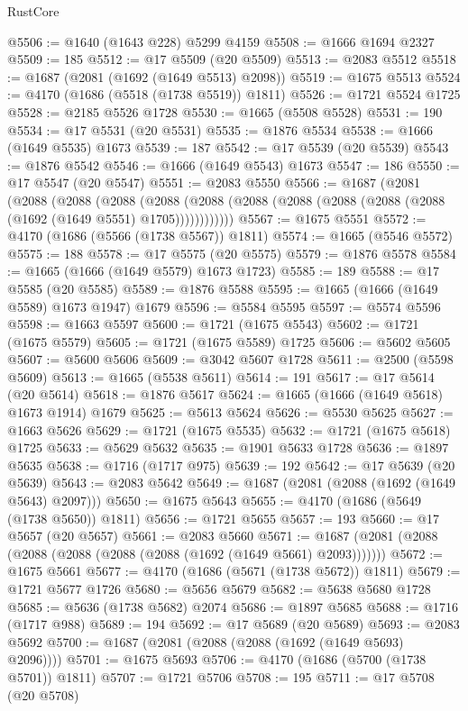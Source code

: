 \begin{lexlean}{RustCore}
\begin{coremodule}
@5506 := @1640 (@1643 @228) @5299 @4159
@5508 := @1666 @1694 @2327
@5509 := 185
@5512 := @17 @5509 (@20 @5509)
@5513 := @2083 @5512
@5518 := @1687 (@2081 (@1692 (@1649 @5513) @2098))
@5519 := @1675 @5513
@5524 := @4170 (@1686 (@5518 (@1738 @5519)) @1811)
@5526 := @1721 @5524 @1725
@5528 := @2185 @5526 @1728
@5530 := @1665 (@5508 @5528)
@5531 := 190
@5534 := @17 @5531 (@20 @5531)
@5535 := @1876 @5534
@5538 := @1666 (@1649 @5535) @1673
@5539 := 187
@5542 := @17 @5539 (@20 @5539)
@5543 := @1876 @5542
@5546 := @1666 (@1649 @5543) @1673
@5547 := 186
@5550 := @17 @5547 (@20 @5547)
@5551 := @2083 @5550
@5566 := @1687
    (@2081
      (@2088
        (@2088
          (@2088
            (@2088 (@2088 (@2088 (@2088 (@2088 (@2088 (@2088 (@1692 (@1649 @5551) @1705))))))))))))
@5567 := @1675 @5551
@5572 := @4170 (@1686 (@5566 (@1738 @5567)) @1811)
@5574 := @1665 (@5546 @5572)
@5575 := 188
@5578 := @17 @5575 (@20 @5575)
@5579 := @1876 @5578
@5584 := @1665 (@1666 (@1649 @5579) @1673 @1723)
@5585 := 189
@5588 := @17 @5585 (@20 @5585)
@5589 := @1876 @5588
@5595 := @1665 (@1666 (@1649 @5589) @1673 @1947) @1679
@5596 := @5584 @5595
@5597 := @5574 @5596
@5598 := @1663 @5597
@5600 := @1721 (@1675 @5543)
@5602 := @1721 (@1675 @5579)
@5605 := @1721 (@1675 @5589) @1725
@5606 := @5602 @5605
@5607 := @5600 @5606
@5609 := @3042 @5607 @1728
@5611 := @2500 (@5598 @5609)
@5613 := @1665 (@5538 @5611)
@5614 := 191
@5617 := @17 @5614 (@20 @5614)
@5618 := @1876 @5617
@5624 := @1665 (@1666 (@1649 @5618) @1673 @1914) @1679
@5625 := @5613 @5624
@5626 := @5530 @5625
@5627 := @1663 @5626
@5629 := @1721 (@1675 @5535)
@5632 := @1721 (@1675 @5618) @1725
@5633 := @5629 @5632
@5635 := @1901 @5633 @1728
@5636 := @1897 @5635
@5638 := @1716 (@1717 @975)
@5639 := 192
@5642 := @17 @5639 (@20 @5639)
@5643 := @2083 @5642
@5649 := @1687 (@2081 (@2088 (@1692 (@1649 @5643) @2097)))
@5650 := @1675 @5643
@5655 := @4170 (@1686 (@5649 (@1738 @5650)) @1811)
@5656 := @1721 @5655
@5657 := 193
@5660 := @17 @5657 (@20 @5657)
@5661 := @2083 @5660
@5671 := @1687 (@2081 (@2088 (@2088 (@2088 (@2088 (@2088 (@1692 (@1649 @5661) @2093)))))))
@5672 := @1675 @5661
@5677 := @4170 (@1686 (@5671 (@1738 @5672)) @1811)
@5679 := @1721 @5677 @1726
@5680 := @5656 @5679
@5682 := @5638 @5680 @1728
@5685 := @5636 (@1738 @5682) @2074
@5686 := @1897 @5685
@5688 := @1716 (@1717 @988)
@5689 := 194
@5692 := @17 @5689 (@20 @5689)
@5693 := @2083 @5692
@5700 := @1687 (@2081 (@2088 (@2088 (@1692 (@1649 @5693) @2096))))
@5701 := @1675 @5693
@5706 := @4170 (@1686 (@5700 (@1738 @5701)) @1811)
@5707 := @1721 @5706
@5708 := 195
@5711 := @17 @5708 (@20 @5708)

\end{coremodule}
\end{lexlean}
